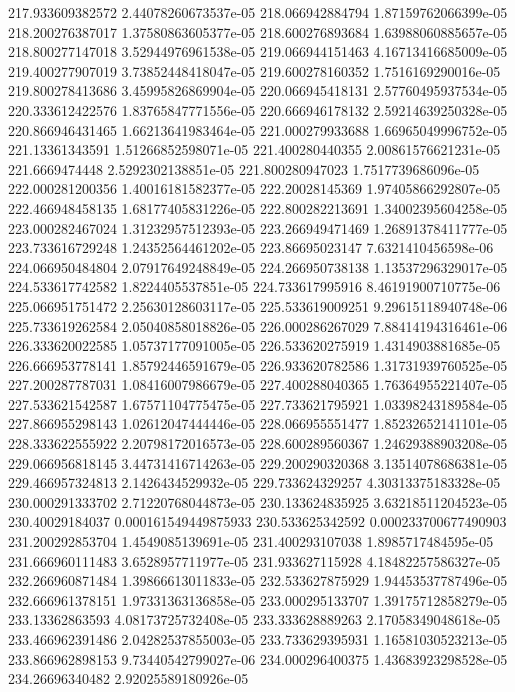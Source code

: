 {217.933609382572 2.44078260673537e-05
218.066942884794 1.87159762066399e-05
218.200276387017 1.37580863605377e-05
218.600276893684 1.63988060885657e-05
218.800277147018 3.52944976961538e-05
219.066944151463 4.16713416685009e-05
219.400277907019 3.73852448418047e-05
219.600278160352 1.7516169290016e-05
219.800278413686 3.45995826869904e-05
220.066945418131 2.57760495937534e-05
220.333612422576 1.83765847771556e-05
220.666946178132 2.59214639250328e-05
220.866946431465 1.66213641983464e-05
221.000279933688 1.66965049996752e-05
221.13361343591 1.51266852598071e-05
221.400280440355 2.00861576621231e-05
221.6669474448 2.5292302138851e-05
221.800280947023 1.7517739686096e-05
222.000281200356 1.40016181582377e-05
222.20028145369 1.97405866292807e-05
222.466948458135 1.68177405831226e-05
222.800282213691 1.34002395604258e-05
223.000282467024 1.31232957512393e-05
223.266949471469 1.26891378411777e-05
223.733616729248 1.24352564461202e-05
223.86695023147 7.6321410456598e-06
224.066950484804 2.07917649248849e-05
224.266950738138 1.13537296329017e-05
224.533617742582 1.8224405537851e-05
224.733617995916 8.46191900710775e-06
225.066951751472 2.25630128603117e-05
225.533619009251 9.29615118940748e-06
225.733619262584 2.05040858018826e-05
226.000286267029 7.88414194316461e-06
226.333620022585 1.05737177091005e-05
226.533620275919 1.4314903881685e-05
226.666953778141 1.85792446591679e-05
226.933620782586 1.31731939760525e-05
227.200287787031 1.08416007986679e-05
227.400288040365 1.76364955221407e-05
227.533621542587 1.67571104775475e-05
227.733621795921 1.03398243189584e-05
227.866955298143 1.02612047444446e-05
228.066955551477 1.85232652141101e-05
228.333622555922 2.20798172016573e-05
228.600289560367 1.24629388903208e-05
229.066956818145 3.44731416714263e-05
229.200290320368 3.13514078686381e-05
229.466957324813 2.1426434529932e-05
229.733624329257 4.30313375183328e-05
230.000291333702 2.71220768044873e-05
230.133624835925 3.63218511204523e-05
230.40029184037 0.000161549449875933
230.533625342592 0.000233700677490903
231.200292853704 1.4549085139691e-05
231.400293107038 1.8985717484595e-05
231.666960111483 3.6528957711977e-05
231.933627115928 4.18482257586327e-05
232.266960871484 1.39866613011833e-05
232.533627875929 1.94453537787496e-05
232.666961378151 1.97331363136858e-05
233.000295133707 1.39175712858279e-05
233.13362863593 4.08173725732408e-05
233.333628889263 2.17058349048618e-05
233.466962391486 2.04282537855003e-05
233.733629395931 1.16581030523213e-05
233.866962898153 9.73440542799027e-06
234.000296400375 1.43683923298528e-05
234.26696340482 2.92025589180926e-05
}
